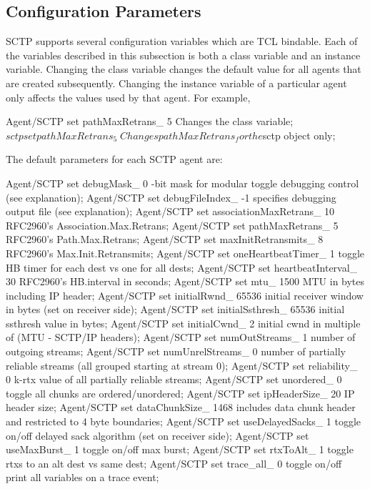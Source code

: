       \subsection{Configuration Parameters}
      \label{sec:sctpConfig}

	 SCTP supports several configuration variables which are TCL
	 bindable. Each of the variables described in this subsection is
	 both a class variable and an instance variable.  Changing the
	 class variable changes the default value for all agents that are
	 created subsequently.  Changing the instance variable of a
	 particular agent only affects the values used by that agent.  For
	 example,

	 \begin{program}
	 Agent/SCTP set pathMaxRetrans_ 5 \; Changes the class variable; 
	 $sctp set pathMaxRetrans_ 5 \; Changes pathMaxRetrans_ for the $sctp object only; 
         \end{program}

	 The default parameters for each SCTP agent are:

	 \begin{program}
	 Agent/SCTP set debugMask_ 0 -bit mask for modular toggle debugging control (see explanation);
	 Agent/SCTP set debugFileIndex_ -1 \; specifies debugging output file (see explanation);
	 Agent/SCTP set associationMaxRetrans_ 10\; RFC2960's Association.Max.Retrans;
	 Agent/SCTP set pathMaxRetrans_ 5 \; RFC2960's Path.Max.Retrans;
	 Agent/SCTP set maxInitRetransmits_ 8 \; RFC2960's Max.Init.Retransmits;
	 Agent/SCTP set oneHeartbeatTimer_ 1 \; toggle HB timer for each dest vs one for all dests;
	 Agent/SCTP set heartbeatInterval_ 30 \; RFC2960's HB.interval in seconds;
	 Agent/SCTP set mtu_ 1500 \; MTU in bytes including IP header;
	 Agent/SCTP set initialRwnd_ 65536 \; initial receiver window in bytes (set on receiver side);
	 Agent/SCTP set initialSsthresh_ 65536 \; initial ssthresh value in bytes;
	 Agent/SCTP set initialCwnd_ 2 \; initial cwnd in multiple of (MTU - SCTP/IP headers);
	 Agent/SCTP set numOutStreams_ 1 \; number of outgoing streams;
	 Agent/SCTP set numUnrelStreams_ 0 \; number of partially reliable streams (all grouped starting at stream 0);
	 Agent/SCTP set reliability_ 0 \; k-rtx value of all partially reliable streams;
	 Agent/SCTP set unordered_ 0 \; toggle all chunks are ordered/unordered;
	 Agent/SCTP set ipHeaderSize_ 20 \; IP header size;
	 Agent/SCTP set dataChunkSize_ 1468 \; includes data chunk header and restricted to 4 byte boundaries;
	 Agent/SCTP set useDelayedSacks_ 1 \; toggle on/off delayed sack algorithm (set on receiver side);
	 Agent/SCTP set useMaxBurst_ 1 \; toggle on/off max burst;
	 Agent/SCTP set rtxToAlt_ 1 \; toggle rtxs to an alt dest vs same dest;
	 Agent/SCTP set trace_all_ 0 \; toggle on/off print all variables on a trace event;
	 \end{program}

